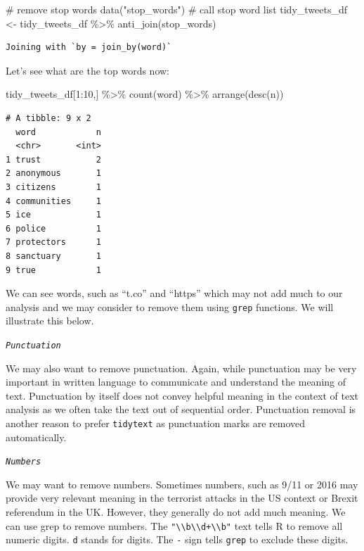 \documentclass[
  letterpaper,
  DIV=11,
  numbers=noendperiod]{scrreprt}
\newenvironment{Shaded}{\begin{snugshade}}{\end{snugshade}}
\newcommand{\CommentTok}[1]{\textcolor[rgb]{0.37,0.37,0.37}{#1}}
\newcommand{\DecValTok}[1]{\textcolor[rgb]{0.68,0.00,0.00}{#1}}
\newcommand{\FunctionTok}[1]{\textcolor[rgb]{0.28,0.35,0.67}{#1}}
\newcommand{\NormalTok}[1]{\textcolor[rgb]{0.00,0.23,0.31}{#1}}
\newcommand{\OtherTok}[1]{\textcolor[rgb]{0.00,0.23,0.31}{#1}}
\newcommand{\SpecialCharTok}[1]{\textcolor[rgb]{0.37,0.37,0.37}{#1}}
\newcommand{\StringTok}[1]{\textcolor[rgb]{0.13,0.47,0.30}{#1}}
\begin{document}
\begin{Shaded}
\begin{Highlighting}[]
\CommentTok{\# remove stop words}
\FunctionTok{data}\NormalTok{(}\StringTok{"stop\_words"}\NormalTok{) }\CommentTok{\# call stop word list}
\NormalTok{ tidy\_tweets\_df }\OtherTok{\textless{}{-}}\NormalTok{ tidy\_tweets\_df }\SpecialCharTok{\%\textgreater{}\%} 
   \FunctionTok{anti\_join}\NormalTok{(stop\_words)}
\end{Highlighting}
\end{Shaded}

\begin{verbatim}
Joining with `by = join_by(word)`
\end{verbatim}

Let's see what are the top words now:

\begin{Shaded}
\begin{Highlighting}[]
\NormalTok{tidy\_tweets\_df[}\DecValTok{1}\SpecialCharTok{:}\DecValTok{10}\NormalTok{,] }\SpecialCharTok{\%\textgreater{}\%} 
  \FunctionTok{count}\NormalTok{(word) }\SpecialCharTok{\%\textgreater{}\%} 
  \FunctionTok{arrange}\NormalTok{(}\FunctionTok{desc}\NormalTok{(n))}
\end{Highlighting}
\end{Shaded}

\begin{verbatim}
# A tibble: 9 x 2
  word            n
  <chr>       <int>
1 trust           2
2 anonymous       1
3 citizens        1
4 communities     1
5 ice             1
6 police          1
7 protectors      1
8 sanctuary       1
9 true            1
\end{verbatim}

We can see words, such as ``t.co'' and ``https'' which may not add much
to our analysis and we may consider to remove them using \texttt{grep}
functions. We will illustrate this below.

\emph{\texttt{Punctuation}}

We may also want to remove punctuation. Again, while punctuation may be
very important in written language to communicate and understand the
meaning of text. Punctuation by itself does not convey helpful meaning
in the context of text analysis as we often take the text out of
sequential order. Punctuation removal is another reason to prefer
\texttt{tidytext} as punctuation marks are removed automatically.

\emph{\texttt{Numbers}}

We may want to remove numbers. Sometimes numbers, such as 9/11 or 2016
may provide very relevant meaning in the terrorist attacks in the US
context or Brexit referendum in the UK. However, they generally do not
add much meaning. We can use grep to remove numbers. The
\texttt{"\textbackslash{}\textbackslash{}b\textbackslash{}\textbackslash{}d+\textbackslash{}\textbackslash{}b"}
text tells R to remove all numeric digits. \texttt{d} stands for digits.
The \texttt{-} sign tells \texttt{grep} to exclude these digits.
\end{document}
